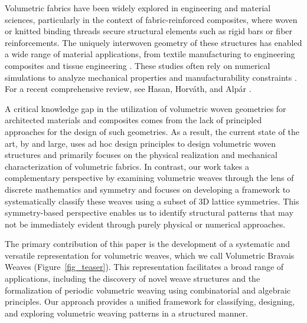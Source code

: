\documentclass[unnumsec,webpdf,contemporary,large]{oup-authoring-template}%
\theoremstyle{thmstyleone}%
\theoremstyle{thmstyletwo}%
\theoremstyle{thmstylethree}%
\newcommand{\ergun}[1]{{\color{black} #1}}
\newcommand{\VRK}[1]{{\color{black} #1}}
\begin{document}
\ergun{Volumetric fabrics have been widely explored in engineering and material sciences, particularly in the context of fabric-reinforced composites, where woven or knitted binding threads secure structural elements such as rigid bars or fiber reinforcements. The uniquely interwoven geometry of these structures has enabled a wide range of material applications, from textile manufacturing \cite{hu2004structure} to engineering composites and tissue engineering \cite{moutos2007biomimetic}. These studies often rely on numerical simulations to analyze mechanical properties and manufacturability constraints \cite{ren20213d,perera2021evolution,wu2020weavecraft,takahashi20193d,el20183d,bilisik2012multiaxis,mohamed2009comparative,kuo2007effect,khokar20013d,khokar19963d,cox1994failure,mohamed1990three,guenon1989toughness,mishra2015modelling, derck3dpatent}. For a recent comprehensive review, see Hasan, Horváth, and Alpár \cite{hasan2021potential}.}

\VRK{A critical knowledge gap in the utilization of volumetric woven geometries for architected materials and composites comes from the lack of principled approaches for the design of such geometries. As a result, the current state of the art, by and large, uses ad hoc design principles to design volumetric woven structures and primarily focuses on the physical realization and mechanical characterization of volumetric fabrics. In contrast, our work takes a complementary perspective by examining volumetric weaves through the lens of discrete mathematics and symmetry and focuses on developing a framework to systematically classify these weaves using a subset of 3D lattice symmetries. This symmetry-based perspective enables us to identify structural patterns that may not be immediately evident through purely physical or numerical approaches.}

\ergun{The primary contribution of this paper is the development of a systematic and versatile representation for volumetric weaves, which we call Volumetric Bravais Weaves (Figure~\ref{fig_teaser}). 
This representation facilitates a broad range of applications, including the discovery of novel weave structures and the formalization of periodic volumetric weaving using combinatorial and algebraic principles. Our approach provides a unified framework for classifying, designing, and exploring volumetric weaving patterns in a structured manner.}
\end{document}
